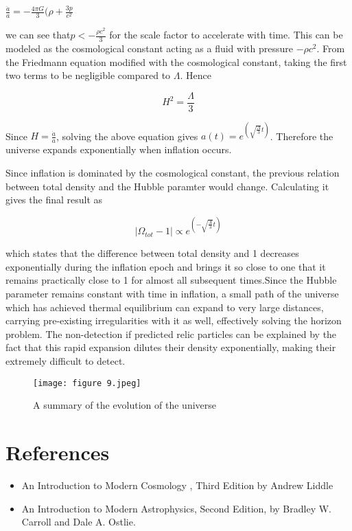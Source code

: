 \documentclass{article}
\begin{document}
 \begin{center}
     $\frac{\ddot{a}}{a} = -\frac{4{\pi}G}{3}(\rho + \frac{3p}{c^2}$
 \end{center}

we can see that$p<-\frac{{\rho}c^2}{3}$ for the scale factor to accelerate with time. This can be modeled as the cosmological constant acting as a  fluid with pressure $-{\rho}c^2$. From the Friedmann equation modified with the cosmological constant, taking the first two terms to be negligible compared to $\Lambda$. Hence 

\begin{equation}
    H^2 = \frac{\Lambda}{3}
\end{equation}

Since $H = \frac{\dot{a}}{a}$, solving the above equation gives $a(t) = e^{({\sqrt{\frac{\Lambda}{3}}t})}$. Therefore the universe expands exponentially when inflation occurs.

Since inflation is dominated by the cosmological constant, the previous relation between total density and the Hubble paramter would change. Calculating it gives the final result as 

\begin{equation}
    |\Omega_{tot}-1| \propto e^{(-{\sqrt{\frac{\Lambda}{3}}t})}
\end{equation}

which states that the difference between total density and 1 decreases exponentially during the inflation epoch and brings it so close to one that it remains practically close to 1 for almost all subsequent times.Since the Hubble parameter remains constant with time in inflation, a small path of the universe which has achieved thermal equilibrium can expand to very large distances, carrying pre-existing irregularities with it as well, effectively solving the horizon problem. The non-detection if predicted relic particles can be explained by the fact that this rapid expansion dilutes their density exponentially, making their extremely difficult to detect.
\\
\begin{figure}[H]
    \centering
    \texttt{[image: figure 9.jpeg]}
    \caption{A summary of the evolution of the universe}
    \label{fig:final}
\end{figure}

\newpage

\section{References}
\begin{itemize}
    \item An Introduction to Modern Cosmology 
    , Third Edition by Andrew Liddle
    \item An Introduction to Modern Astrophysics, Second Edition, by Bradley W. Carroll and Dale A. Ostlie.
\end{itemize}
\end{document}
